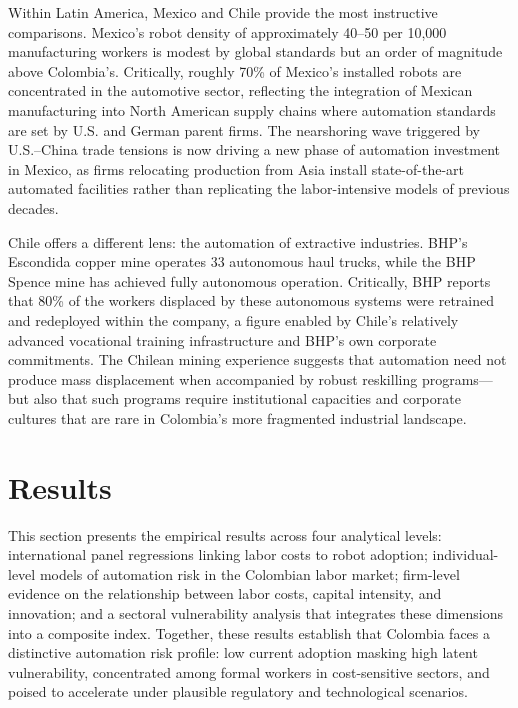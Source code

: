 Within Latin America, Mexico and Chile provide the most instructive comparisons. Mexico's robot density of approximately 40--50 per 10,000 manufacturing workers is modest by global standards but an order of magnitude above Colombia's. Critically, roughly 70\% of Mexico's installed robots are concentrated in the automotive sector, reflecting the integration of Mexican manufacturing into North American supply chains where automation standards are set by U.S. and German parent firms. The nearshoring wave triggered by U.S.--China trade tensions is now driving a new phase of automation investment in Mexico, as firms relocating production from Asia install state-of-the-art automated facilities rather than replicating the labor-intensive models of previous decades.

Chile offers a different lens: the automation of extractive industries. BHP's Escondida copper mine operates 33 autonomous haul trucks, while the BHP Spence mine has achieved fully autonomous operation. Critically, BHP reports that 80\% of the workers displaced by these autonomous systems were retrained and redeployed within the company, a figure enabled by Chile's relatively advanced vocational training infrastructure and BHP's own corporate commitments. The Chilean mining experience suggests that automation need not produce mass displacement when accompanied by robust reskilling programs---but also that such programs require institutional capacities and corporate cultures that are rare in Colombia's more fragmented industrial landscape.


\section{Results}
\label{sec:results}

This section presents the empirical results across four analytical levels: international panel regressions linking labor costs to robot adoption; individual-level models of automation risk in the Colombian labor market; firm-level evidence on the relationship between labor costs, capital intensity, and innovation; and a sectoral vulnerability analysis that integrates these dimensions into a composite index. Together, these results establish that Colombia faces a distinctive automation risk profile: low current adoption masking high latent vulnerability, concentrated among formal workers in cost-sensitive sectors, and poised to accelerate under plausible regulatory and technological scenarios.

